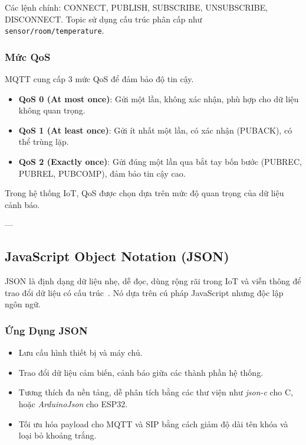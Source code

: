 Các lệnh chính: CONNECT, PUBLISH, SUBSCRIBE, UNSUBSCRIBE, DISCONNECT. Topic sử dụng cấu trúc phân cấp như \texttt{sensor/room/temperature}.

\subsubsection{Mức QoS}
\label{subsubsec:mqtt_qos}

MQTT cung cấp 3 mức QoS để đảm bảo độ tin cậy.

\begin{itemize}
\item \textbf{QoS 0 (At most once)}: Gửi một lần, không xác nhận, phù hợp cho dữ liệu không quan trọng.
\item \textbf{QoS 1 (At least once)}: Gửi ít nhất một lần, có xác nhận (PUBACK), có thể trùng lặp.
\item \textbf{QoS 2 (Exactly once)}: Gửi đúng một lần qua bắt tay bốn bước (PUBREC, PUBREL, PUBCOMP), đảm bảo tin cậy cao.
\end{itemize}

Trong hệ thống IoT, QoS được chọn dựa trên mức độ quan trọng của dữ liệu cảnh báo.

---

\subsection{JavaScript Object Notation (JSON)}
\label{subsec:json_format}

JSON là định dạng dữ liệu nhẹ, dễ đọc, dùng rộng rãi trong IoT và viễn thông để trao đổi dữ liệu có cấu trúc~\cite{json_rfc8259}. Nó dựa trên cú pháp JavaScript nhưng độc lập ngôn ngữ.

\subsubsection{Ứng Dụng JSON}
\label{subsubsec:json_applications}

\begin{itemize}
\item Lưu cấu hình thiết bị và máy chủ.
\item Trao đổi dữ liệu cảm biến, cảnh báo giữa các thành phần hệ thống.
\item Tương thích đa nền tảng, dễ phân tích bằng các thư viện như \textit{json-c} cho C, hoặc \textit{ArduinoJson} cho ESP32.
\item Tối ưu hóa payload cho MQTT và SIP bằng cách giảm độ dài tên khóa và loại bỏ khoảng trắng.
\end{itemize}


